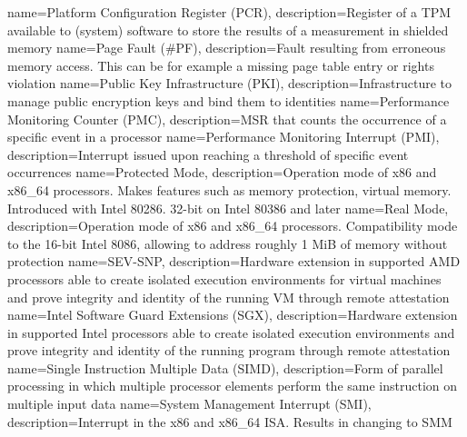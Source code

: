 %
{
  name=Platform Configuration Register (PCR),
  description={Register of a TPM available to (system) software to store the results of a measurement in shielded
  memory}
}
{
  name=Page Fault (\#PF),
  description={Fault resulting from erroneous memory access. This can be for example a missing page table entry or
  rights violation}
}
{
  name=Public Key Infrastructure (PKI),
  description={Infrastructure to manage public encryption keys and bind them to identities}
}
{
  name=Performance Monitoring Counter (PMC),
  description={MSR that counts the occurrence of a specific event in a processor}
}
{
  name=Performance Monitoring Interrupt (PMI),
  description={Interrupt issued upon reaching a threshold of specific event occurrences}
}
{
  name=Protected Mode,
  description={Operation mode of x86 and x86\_64 processors. Makes features such as memory protection, virtual memory.
  Introduced with Intel 80286. 32-bit on Intel 80386 and later}
}
%
{
  name=Real Mode,
  description={Operation mode of x86 and x86\_64 processors. Compatibility mode to the 16-bit Intel 8086, allowing to
  address roughly 1 MiB of memory without protection}
}
%
{
  name=SEV-SNP,
  description={Hardware extension in supported AMD processors able to create isolated execution environments for
  virtual machines and prove integrity and identity of the running VM through remote attestation}
}
{
  name=Intel Software Guard Extensions (SGX),
  description={Hardware extension in supported Intel processors able to create isolated execution environments and
  prove integrity and identity of the running program through remote attestation}
}
{
  name=Single Instruction Multiple Data (SIMD),
  description={Form of parallel processing in which multiple processor elements perform the same instruction on
  multiple input data}
}
{
  name=System Management Interrupt (SMI),
  description={Interrupt in the x86 and x86\_64 ISA. Results in changing to SMM}
}
